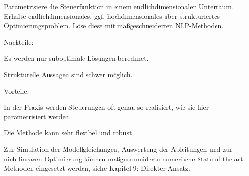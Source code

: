 Parametrisiere die Steuerfunktion in einem endlichdimensionalen Unterraum. Erhalte endlichdimensionales, ggf. hochdimensionales aber strukturiertes Optimierungsproblem. Löse diese mit maßgeschneiderten NLP-Methoden.

Nachteile:

\bitm
\item Es werden nur suboptimale Lösungen berechnet.
\item Strukturelle Aussagen sind schwer möglich.
\eitm

Vorteile:

\bitm
\item In der Praxis werden Steuerungen oft genau so realisiert, wie sie hier parametrisiert werden.
\item Die Methode kann sehr flexibel und robust 
\item Zur Simulation der Modellgleichungen, Auswertung der Ableitungen und zur nichtlinearen Optimierung können maßgeschneiderte numerische State-of-the-art-Methoden eingesetzt werden, siehe Kapitel 9: Direkter Ansatz.
\eitm

